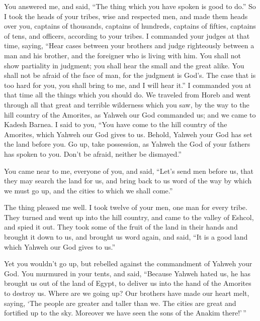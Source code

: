  You answered me, and said, ``The thing which you have
spoken is good to do.''  So I took the heads of your
tribes, wise and respected men, and made them heads over you, captains
of thousands, captains of hundreds, captains of fifties, captains of
tens, and officers, according to your tribes.  I
commanded your judges at that time, saying, ``Hear cases between your
brothers and judge righteously between a man and his brother, and the
foreigner who is living with him.  You shall not show
partiality in judgment; you shall hear the small and the great alike.
You shall not be afraid of the face of man, for the judgment is God's.
The case that is too hard for you, you shall bring to me, and I will
hear it.''  I commanded you at that time all the things
which you should do.  We traveled from Horeb and went
through all that great and terrible wilderness which you saw, by the way
to the hill country of the Amorites, as Yahweh our God commanded us; and
we came to Kadesh Barnea.  I said to you, ``You have come
to the hill country of the Amorites, which Yahweh our God gives to us.
 Behold, Yahweh your God has set the land before you. Go
up, take possession, as Yahweh the God of your fathers has spoken to
you. Don't be afraid, neither be dismayed.''

 You came near to me, everyone of you, and said, ``Let's
send men before us, that they may search the land for us, and bring back
to us word of the way by which we must go up, and the cities to which we
shall come.''

 The thing pleased me well. I took twelve of your men,
one man for every tribe.  They turned and went up into
the hill country, and came to the valley of Eshcol, and spied it out.
 They took some of the fruit of the land in their hands
and brought it down to us, and brought us word again, and said, ``It is
a good land which Yahweh our God gives to us.''

 Yet you wouldn't go up, but rebelled against the
commandment of Yahweh your God.  You murmured in your
tents, and said, ``Because Yahweh hated us, he has brought us out of the
land of Egypt, to deliver us into the hand of the Amorites to destroy
us.  Where are we going up? Our brothers have made our
heart melt, saying, `The people are greater and taller than we. The
cities are great and fortified up to the sky. Moreover we have seen the
sons of the Anakim there!'\,''

